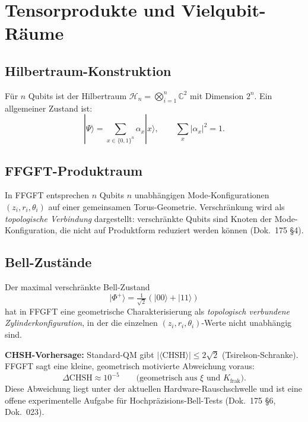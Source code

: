 \section{Tensorprodukte und Vielqubit-Räume}

\subsection{Hilbertraum-Konstruktion}

Für $n$ Qubits ist der Hilbertraum
$\mathcal{H}_n = \bigotimes_{i=1}^{n} \mathbb{C}^2$ mit Dimension $2^n$.
Ein allgemeiner Zustand ist:
\begin{equation}
  |\Psi\rangle = \sum_{x \in \{0,1\}^n} \alpha_x |x\rangle,
  \qquad
  \sum_x |\alpha_x|^2 = 1.
\end{equation}

\subsection{FFGFT-Produktraum}

In FFGFT entsprechen $n$ Qubits $n$ unabhängigen Mode-Konfigurationen
$(z_i, r_i, \theta_i)$ auf einer gemeinsamen Torus-Geometrie.
Verschränkung wird als \emph{topologische Verbindung} dargestellt:
verschränkte Qubits sind Knoten der Mode-Konfiguration, die nicht
auf Produktform reduziert werden können (Dok.~175 §4).

\subsection{Bell-Zustände}

Der maximal verschränkte Bell-Zustand
\begin{equation}
  |\Phi^+\rangle = \tfrac{1}{\sqrt{2}}(|00\rangle + |11\rangle)
\end{equation}
hat in FFGFT eine geometrische Charakterisierung als
\emph{topologisch verbundene Zylinderkonfiguration}, in der die
einzelnen $(z_i, r_i, \theta_i)$-Werte nicht unabhängig sind.

\textbf{CHSH-Vorhersage:} Standard-QM gibt
$|\langle\text{CHSH}\rangle| \leq 2\sqrt{2}$ (Tsirelson-Schranke).
FFGFT sagt eine kleine, geometrisch motivierte Abweichung voraus:
\begin{equation}
  \Delta\text{CHSH} \approx 10^{-5}
  \qquad\text{(geometrisch aus $\xi$ und $K_{\text{frak}}$)}.
\end{equation}
Diese Abweichung liegt unter der aktuellen Hardware-Rauschschwelle
und ist eine offene experimentelle Aufgabe für
Hochpräzisions-Bell-Tests (Dok.~175 §6, Dok.~023).

